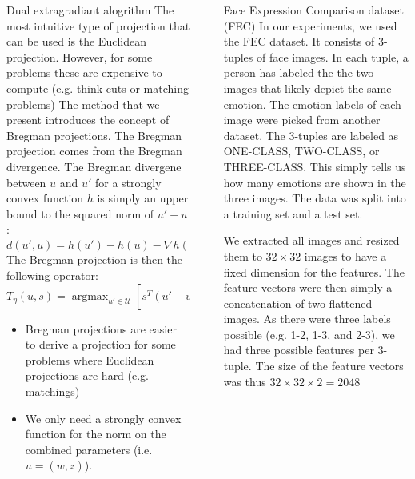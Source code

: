 \documentclass[final]{beamer}
\DeclareMathOperator*{\argmax}{\arg\max}
\newlength{\sepwidth}
\newlength{\colwidth}
\newcommand{\separatorcolumn}{\begin{column}{\sepwidth}\end{column}}
\begin{document}
\begin{frame}[t]
\begin{columns}[t]
\begin{column}{\colwidth}
\begin{block}{Dual extragradiant alogrithm}
    The most intuitive type of projection that can be used is the Euclidean projection.
    However, for some problems these are expensive to compute (e.g. think cuts or matching problems)
    The method that we present introduces the concept of Bregman projections.
    The Bregman projection comes from the Bregman divergence. The Bregman divergene between $u$ and $u'$ for a strongly convex function 
    $h$ is simply an upper bound to the squared  norm of $u' - u$ :
    \begin{equation*}
      d(u', u) = h(u') - h(u) - \nabla h(u)^T (u' - u) \geq \lVert u' - u \rVert^2
    \end{equation*}
    The Bregman projection is then the following operator:
    \begin{equation*}
      T_{\eta}(u,s) = \argmax_{u' \in \mathcal{U}} \left[ s^T (u' - u) - \frac{1}{\eta} d(u', u)\right]
      \end{equation*}
    \begin{itemize}
      \item Bregman projections are easier to derive a projection for some problems where Euclidean projections are hard (e.g. matchings)
      \item We only need a strongly convex function for the norm on the combined parameters (i.e. $u = (w,z)$).
    \end{itemize}
  \end{block}
\end{column}

\separatorcolumn

\begin{column}{\colwidth}

  \begin{alertblock}{Face Expression Comparison dataset (FEC)}
    In our experiments, we used the FEC dataset. It consists of 3-tuples of face images. In each tuple, a person has labeled the 
    the two images that likely depict the same emotion. The emotion labels of each image were picked from another dataset. The 3-tuples
    are labeled as ONE-CLASS, TWO-CLASS, or THREE-CLASS. This simply tells us how many emotions are shown in the three images. The data
    was split into a training set and a test set.

    We extracted all images and resized them to $32 \times 32$ images to have a fixed dimension for the features. The feature vectors
    were then simply a concatenation of two flattened images. As there were three labels possible (e.g. 1-2, 1-3, and 2-3), we had three
    possible features per 3-tuple. The size of the feature vectors was thus $32 \times 32 \times 2 = 2048$


\end{alertblock}
\end{column}
\end{columns}
\end{frame}
\end{document}
